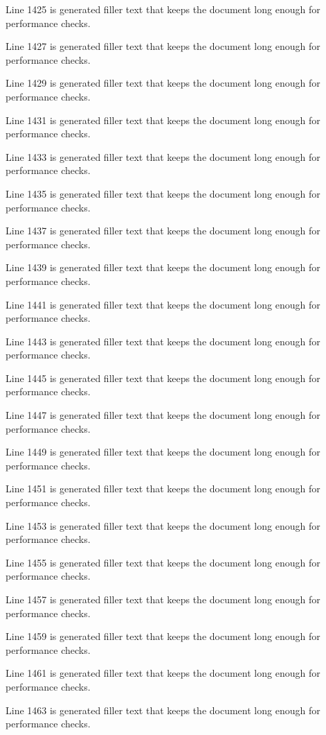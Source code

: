 Line 1425 is generated filler text that keeps the document long enough for performance checks.

Line 1427 is generated filler text that keeps the document long enough for performance checks.

Line 1429 is generated filler text that keeps the document long enough for performance checks.

Line 1431 is generated filler text that keeps the document long enough for performance checks.

Line 1433 is generated filler text that keeps the document long enough for performance checks.

Line 1435 is generated filler text that keeps the document long enough for performance checks.

Line 1437 is generated filler text that keeps the document long enough for performance checks.

Line 1439 is generated filler text that keeps the document long enough for performance checks.

Line 1441 is generated filler text that keeps the document long enough for performance checks.

Line 1443 is generated filler text that keeps the document long enough for performance checks.

Line 1445 is generated filler text that keeps the document long enough for performance checks.

Line 1447 is generated filler text that keeps the document long enough for performance checks.

Line 1449 is generated filler text that keeps the document long enough for performance checks.

Line 1451 is generated filler text that keeps the document long enough for performance checks.

Line 1453 is generated filler text that keeps the document long enough for performance checks.

Line 1455 is generated filler text that keeps the document long enough for performance checks.

Line 1457 is generated filler text that keeps the document long enough for performance checks.

Line 1459 is generated filler text that keeps the document long enough for performance checks.

Line 1461 is generated filler text that keeps the document long enough for performance checks.

Line 1463 is generated filler text that keeps the document long enough for performance checks.

